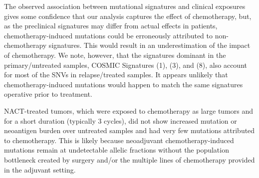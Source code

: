 The observed association between mutational signatures and clinical exposures gives some confidence that our analysis captures the effect of chemotherapy, but, as the preclinical signatures may differ from actual effects in patients, chemotherapy-induced mutations could be erroneously attributed to non-chemotherapy signatures. This would result in an underestimation of the impact of chemotherapy. We note, however, that the signatures dominant in the primary/untreated samples, COSMIC Signatures (1), (3), and (8), also account for most of the SNVs in relapse/treated samples. It appears unlikely that chemotherapy-induced mutations would happen to match the same signatures operative prior to treatment.



NACT-treated tumors, which were exposed to chemotherapy as large tumors and for a short duration (typically 3 cycles), did not show increased mutation or neoantigen burden over untreated samples and had very few mutations attributed to chemotherapy. This is likely because neoadjuvant chemotherapy-induced mutations remain at undetectable allelic fractions without the population bottleneck created by surgery and/or the multiple lines of chemotherapy provided in the adjuvant setting.


